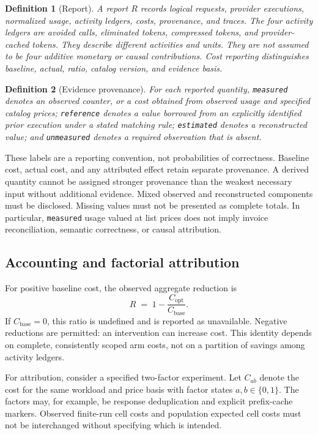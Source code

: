 \documentclass[11pt,a4paper]{article}
\newtheorem{definition}{Definition}
\begin{document}
\begin{definition}[Report]
A report $R$ records logical requests, provider executions, normalized usage, activity ledgers,
costs, provenance, and traces. The four activity ledgers are avoided calls, eliminated tokens,
compressed tokens, and provider-cached tokens. They describe different activities and units.
They are not assumed to be four additive monetary or causal contributions. Cost reporting
distinguishes baseline, actual, ratio, catalog version, and evidence basis.
\end{definition}

\begin{definition}[Evidence provenance]
For each reported quantity, \texttt{measured} denotes an observed counter, or a cost obtained
from observed usage and specified catalog prices; \texttt{reference} denotes a value borrowed
from an explicitly identified prior execution under a stated matching rule; \texttt{estimated}
denotes a reconstructed value; and \texttt{unmeasured} denotes a required observation that is
absent.
\end{definition}

These labels are a reporting convention, not probabilities of correctness. Baseline cost, actual
cost, and any attributed effect retain separate provenance. A derived quantity cannot be assigned
stronger provenance than the weakest necessary input without additional evidence. Mixed observed
and reconstructed components must be disclosed. Missing values must not be presented as complete
totals. In particular, \texttt{measured} usage valued at list prices does not imply invoice
reconciliation, semantic correctness, or causal attribution.

\subsection{Accounting and factorial attribution}\label{sec:atribucion}
For positive baseline cost, the observed aggregate reduction is
\begin{equation}
R \;=\; 1 - \frac{C_{\mathrm{opt}}}{C_{\mathrm{base}}} .
\label{eq:reduccion}
\end{equation}
If $C_{\mathrm{base}}=0$, this ratio is undefined and is reported as unavailable. Negative
reductions are permitted: an intervention can increase cost. This identity depends on complete,
consistently scoped arm costs, not on a partition of savings among activity ledgers.

For attribution, consider a specified two-factor experiment. Let $C_{ab}$ denote the cost for the
same workload and price basis with factor states $a,b\in\{0,1\}$. The factors may, for example,
be response deduplication and explicit prefix-cache markers. Observed finite-run cell costs and
population expected cell costs must not be interchanged without specifying which is intended.
\end{document}
